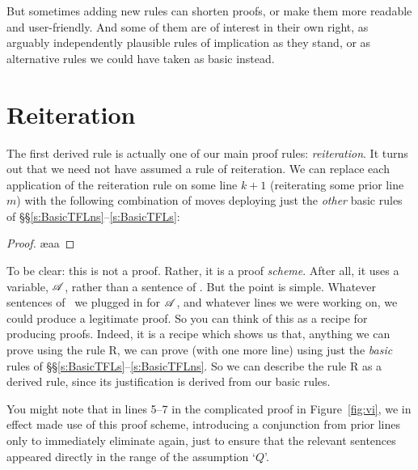  But sometimes adding new rules can shorten proofs, or make them more readable and user-friendly. And some of them are of interest in their own right, as arguably independently plausible rules of implication as they stand, or as alternative rules we could have taken as basic instead.

\section{Reiteration}\label{der.reit}
The first derived rule is actually one of our main proof rules: \emph{reiteration}. It turns out that we need not have assumed a rule of reiteration. We can replace each application of the reiteration rule on some line $k+1$ (reiterating some prior line $m$) with the following combination of moves deploying just the \emph{other} basic rules of §§\ref{s:BasicTFLns}–\ref{s:BasicTFLs}:
\begin{proof}
	\ae{aa}
\end{proof}
To be clear: this is not a proof. Rather, it is a proof  \emph{scheme}. After all, it uses a variable, $\mathscr{A}$, rather than a sentence of \TFL. But the point is simple. Whatever sentences of \TFL\ we plugged in for $\mathscr{A}$, and whatever lines we were working on, we could produce a legitimate proof. So you can think of this as a recipe for producing proofs. Indeed, it is a recipe which shows us that, anything we can prove using the rule R, we can prove (with one more line) using just the \emph{basic} rules of §§\ref{s:BasicTFLs}–\ref{s:BasicTFLns}. So we can describe the rule R as a derived rule, since its justification is derived from our basic rules.

You might note that in lines 5–7 in the complicated proof in Figure~\ref{fig:vi}, we in effect made use of this proof scheme, introducing a conjunction from prior lines only to immediately eliminate again, just to ensure that the relevant sentences appeared directly in the range of the assumption `$Q$'.

